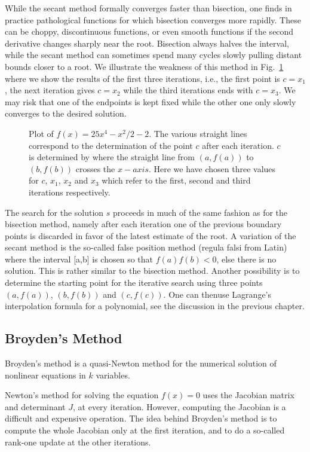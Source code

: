 While the secant method formally converges faster than bisection, one
finds in practice pathological functions for which bisection converges more rapidly.
These can be choppy, discontinuous functions, or even smooth functions if the second
derivative changes sharply near the root. Bisection always halves the interval, while
the secant method  can sometimes spend many cycles slowly pulling distant
bounds closer to a root. 
We illustrate the weakness of this method in Fig.\ \ref{fig:chap8fig3}
where we show the results of the first three iterations, i.e.,
the first point is $c=x_1$, the next iteration gives $c=x_2$ while
the third iterations ends with $c=x_3$. We may risk that
one of the endpoints is kept fixed while the other one only slowly converges to  
the desired solution.
\begin{figure}
%   
   \caption{Plot of $f(x)=25x^4-x^2/2-2$. The various straight lines correspond
            to the determination of the point $c$ after each iteration.  
            $c$ is determined by where the straight line from $(a,f(a))$ 
            to $(b,f(b))$ crosses the $x-axis$. Here we have chosen three values
            for $c$, $x_1$, $x_2$ and $x_3$ which refer to the first, second and third
            iterations respectively.}
   \label{fig:chap8fig3}
\end{figure}

The search for the solution $s$ proceeds in much of the same fashion as for 
the bisection method, namely
after each iteration one of
the previous boundary points is discarded in favor of the latest estimate of the root.
A variation of the secant method is the so-called false position method
(regula falsi from Latin) where the interval [a,b] is chosen so that
$f(a)f(b) <0$, else there is no solution. This is rather similar 
to the bisection method.
Another possibility is to determine the starting point for the iterative search
using three points $(a,f(a))$, $(b,f(b))$ and $(c,f(c))$. 
One can thenuse Lagrange's 
interpolation formula for a polynomial, see the discussion in the previous chapter.
\subsection{Broyden's Method}
Broyden's method is a quasi-Newton method for the numerical solution of nonlinear equations in $k$ variables. 

Newton's method for solving the equation $f(x) = 0$ uses the Jacobian matrix and determinant $J$, 
at every iteration. However, computing the Jacobian is a difficult and expensive operation. 
The idea behind Broyden's method is to compute the whole Jacobian only at the first iteration, 
and to do a so-called rank-one update at the other iterations.

